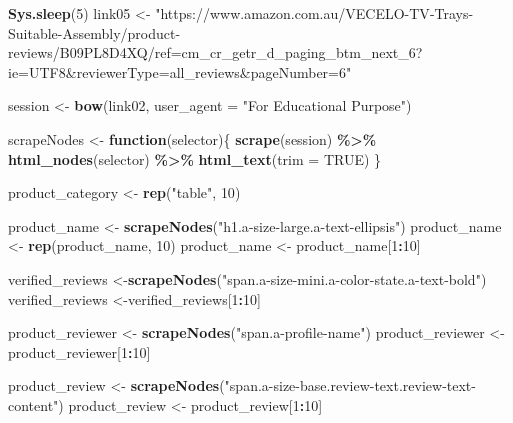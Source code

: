 \documentclass[
]{article}
\newenvironment{Shaded}{\begin{snugshade}}{\end{snugshade}}
\newcommand{\AttributeTok}[1]{\textcolor[rgb]{0.13,0.29,0.53}{#1}}
\newcommand{\ConstantTok}[1]{\textcolor[rgb]{0.56,0.35,0.01}{#1}}
\newcommand{\ControlFlowTok}[1]{\textcolor[rgb]{0.13,0.29,0.53}{\textbf{#1}}}
\newcommand{\DecValTok}[1]{\textcolor[rgb]{0.00,0.00,0.81}{#1}}
\newcommand{\FunctionTok}[1]{\textcolor[rgb]{0.13,0.29,0.53}{\textbf{#1}}}
\newcommand{\NormalTok}[1]{#1}
\newcommand{\OtherTok}[1]{\textcolor[rgb]{0.56,0.35,0.01}{#1}}
\newcommand{\SpecialCharTok}[1]{\textcolor[rgb]{0.81,0.36,0.00}{\textbf{#1}}}
\newcommand{\StringTok}[1]{\textcolor[rgb]{0.31,0.60,0.02}{#1}}
\begin{document}
\begin{Shaded}
\begin{Highlighting}[]
   \FunctionTok{Sys.sleep}\NormalTok{(}\DecValTok{5}\NormalTok{)}
\NormalTok{link05 }\OtherTok{\textless{}{-}} \StringTok{"https://www.amazon.com.au/VECELO{-}TV{-}Trays{-}Suitable{-}Assembly/product{-}reviews/B09PL8D4XQ/ref=cm\_cr\_getr\_d\_paging\_btm\_next\_6?ie=UTF8\&reviewerType=all\_reviews\&pageNumber=6"}


\NormalTok{  session }\OtherTok{\textless{}{-}} \FunctionTok{bow}\NormalTok{(link02,}
               \AttributeTok{user\_agent =} \StringTok{"For Educational Purpose"}\NormalTok{)}

\NormalTok{  scrapeNodes }\OtherTok{\textless{}{-}} \ControlFlowTok{function}\NormalTok{(selector)\{}
    \FunctionTok{scrape}\NormalTok{(session) }\SpecialCharTok{\%\textgreater{}\%}
      \FunctionTok{html\_nodes}\NormalTok{(selector) }\SpecialCharTok{\%\textgreater{}\%}
      \FunctionTok{html\_text}\NormalTok{(}\AttributeTok{trim =} \ConstantTok{TRUE}\NormalTok{)}
\NormalTok{  \}}

\NormalTok{  product\_category }\OtherTok{\textless{}{-}} \FunctionTok{rep}\NormalTok{(}\StringTok{"table"}\NormalTok{, }\DecValTok{10}\NormalTok{)}

\NormalTok{  product\_name }\OtherTok{\textless{}{-}} \FunctionTok{scrapeNodes}\NormalTok{(}\StringTok{"h1.a{-}size{-}large.a{-}text{-}ellipsis"}\NormalTok{)}
\NormalTok{  product\_name }\OtherTok{\textless{}{-}} \FunctionTok{rep}\NormalTok{(product\_name, }\DecValTok{10}\NormalTok{)}
\NormalTok{  product\_name }\OtherTok{\textless{}{-}}\NormalTok{ product\_name[}\DecValTok{1}\SpecialCharTok{:}\DecValTok{10}\NormalTok{]}
  
\NormalTok{  verified\_reviews }\OtherTok{\textless{}{-}}\FunctionTok{scrapeNodes}\NormalTok{(}\StringTok{"span.a{-}size{-}mini.a{-}color{-}state.a{-}text{-}bold"}\NormalTok{)}
\NormalTok{  verified\_reviews }\OtherTok{\textless{}{-}}\NormalTok{verified\_reviews[}\DecValTok{1}\SpecialCharTok{:}\DecValTok{10}\NormalTok{]}
  
\NormalTok{  product\_reviewer }\OtherTok{\textless{}{-}} \FunctionTok{scrapeNodes}\NormalTok{(}\StringTok{"span.a{-}profile{-}name"}\NormalTok{)}
\NormalTok{  product\_reviewer }\OtherTok{\textless{}{-}}\NormalTok{ product\_reviewer[}\DecValTok{1}\SpecialCharTok{:}\DecValTok{10}\NormalTok{]}
  
\NormalTok{  product\_review }\OtherTok{\textless{}{-}} \FunctionTok{scrapeNodes}\NormalTok{(}\StringTok{"span.a{-}size{-}base.review{-}text.review{-}text{-}content"}\NormalTok{)}
\NormalTok{  product\_review }\OtherTok{\textless{}{-}}\NormalTok{ product\_review[}\DecValTok{1}\SpecialCharTok{:}\DecValTok{10}\NormalTok{]}
  

\end{Highlighting}
\end{Shaded}
\end{document}
